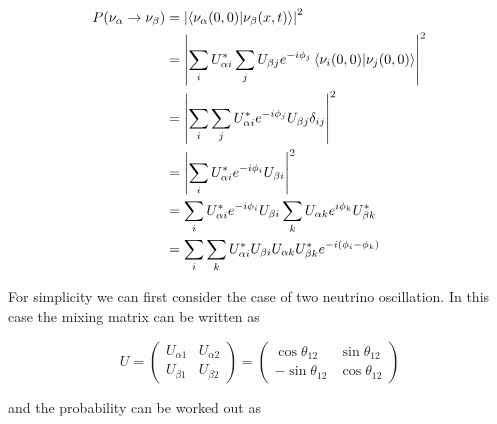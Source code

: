 \begin{equation}	
\begin{split}
	P(\nu_\alpha \rightarrow \nu_\beta) &= \abs{\bra{\nu_\alpha(0,0)}\ket{\nu_\beta(x,t)}}^2 \\
	&=\abs{\sum_i U^{*}_{\alpha i} \sum_{j}U_{\beta j}e^{-i\phi_j}\bra{\nu_i(0,0)}\ket{\nu_j(0,0)}}^2 \\
	&=\abs{\sum_{i}\sum_{j}U^{*}_{\alpha i}e^{-i\phi_j}U_{\beta j}\delta_{ij}}^2 \\
	&=\abs{\sum_{i}U^{*}_{\alpha i}e^{-i\phi_i}U_{\beta i}}^2 \\
	&=\sum_{i}U^{*}_{\alpha i}e^{-i\phi_i}U_{\beta i} \sum_{k}U_{\alpha k}e^{i\phi_k}U^{*}_{\beta k} \\
	&=\sum_{i}\sum_{k}U^{*}_{\alpha i}U_{\beta i}U_{\alpha k}U^{*}_{\beta k}e^{-i(\phi_{i}-\phi_{k})}
\end{split}
\end{equation}

For simplicity we can first consider the case of two neutrino oscillation. In this case the mixing matrix can be written as 

\begin{equation}	
U = 
\begin{pmatrix}
U_{\alpha 1} & U_{\alpha 2} \\
U_{\beta 1} & U_{\beta 2}
\end{pmatrix} = 
\begin{pmatrix}
\cos\theta_{12} & \sin\theta_{12} \\
-\sin\theta_{12} & \cos\theta_{12}
\end{pmatrix}
\end{equation}

and the probability can be worked out as

